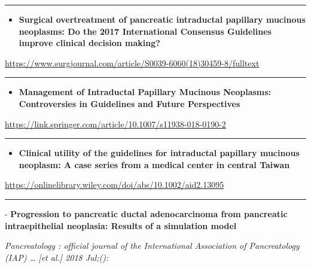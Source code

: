 \documentclass[]{article}
\providecommand{\tightlist}{%
  \setlength{\itemsep}{0pt}\setlength{\parskip}{0pt}}
\begin{document}
{}

{}

\begin{center}\rule{0.5\linewidth}{\linethickness}\end{center}

\begin{itemize}
\tightlist
\item
  \textbf{Surgical overtreatment of pancreatic intraductal papillary
  mucinous neoplasms: Do the 2017 International Consensus Guidelines
  improve clinical decision making?}
\end{itemize}

\url{https://www.surgjournal.com/article/S0039-6060(18)30459-8/fulltext}

\begin{center}\rule{0.5\linewidth}{\linethickness}\end{center}

\begin{itemize}
\tightlist
\item
  \textbf{Management of Intraductal Papillary Mucinous Neoplasms:
  Controversies in Guidelines and Future Perspectives}
\end{itemize}

\url{https://link.springer.com/article/10.1007/s11938-018-0190-2}

\begin{center}\rule{0.5\linewidth}{\linethickness}\end{center}

\begin{itemize}
\tightlist
\item
  \textbf{Clinical utility of the guidelines for intraductal papillary
  mucinous neoplasm: A case series from a medical center in central
  Taiwan}
\end{itemize}

\url{https://onlinelibrary.wiley.com/doi/abs/10.1002/aid2.13095}

\begin{center}\rule{0.5\linewidth}{\linethickness}\end{center}

 - \textbf{Progression to pancreatic ductal adenocarcinoma from
pancreatic intraepithelial neoplasia: Results of a simulation model}

\emph{Pancreatology : official journal of the International Association
of Pancreatology (IAP) \ldots{} {[}et al.{]} 2018 Jul;():}
\end{document}
